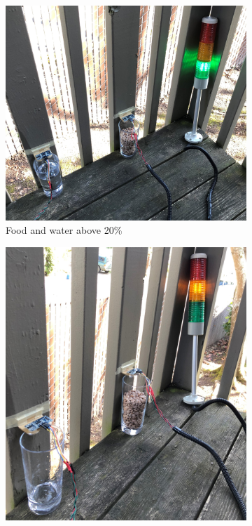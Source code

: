 \documentclass{article}
\begin{document}
\begin{figure}[H]
    \centering
    \begin{subfigure}[b]{0.45\textwidth}
        \centering
        \includegraphics[width=\linewidth]{fig/green.jpg}
        \caption[]%
        {Food and water above 20\%}
    \end{subfigure} 
    \hfill
    \begin{subfigure}[b]{0.45\textwidth}
        \centering
        \includegraphics[width=\linewidth]{fig/yellow.jpg}

\end{subfigure}
\end{figure}
\end{document}
